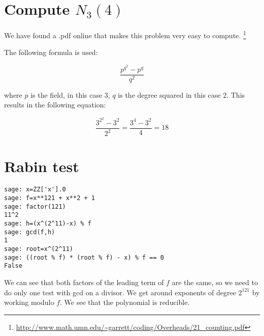 \documentclass{article}
\begin{document}
\section{Compute $N_3(4)$} 

We have found a .pdf online that makes this problem very easy to compute.
\footnote{\url{http://www.math.umn.edu/~garrett/coding/Overheads/21_counting.pdf}}

The following formula is used:

\[
\frac{p^{q^2} - p^q}{q^2}
\]

where $p$ is the field, in this case $3$, $q$ is the degree squared in this case $2$.
This results in the following equation:

\[
\frac{3^{2^2} - 3^2}{2^2} = \frac{3^4 - 3^2}{4} = 18
\]

\section{Rabin test}
\begin{verbatim}
sage: x=ZZ['x'].0
sage: f=x**121 + x**2 + 1
sage: factor(121)
11^2
sage: h=(x^(2^11)-x) % f
sage: gcd(f,h)
1
sage: root=x^(2^11)
sage: ((root % f) * (root % f) - x) % f == 0
False
\end{verbatim}
We can see that both factors of the leading term of $f$ are the same, so we need to do only one test with gcd on a divisor.
We get around exponents of degree $2^{121}$ by working modulo $f$.
We see that the polynomial is reducible.
\end{document}
